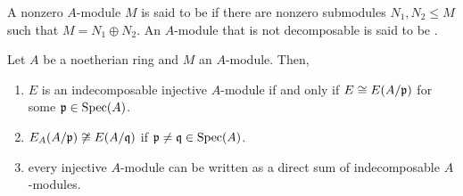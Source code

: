 \begin{definition}
    A nonzero $A$-module $M$ is said to be  if there are nonzero submodules $N_1, N_2\le M$ such that $M = N_1\oplus N_2$. An $A$-module that is not decomposable is said to be .
\end{definition}

\begin{theorem}[Matlis]
    Let $A$ be a noetherian ring and $M$ an $A$-module. Then, 
    \begin{enumerate}[label=(\alph*)]
        \item $E$ is an indecomposable injective $A$-module if and only if $E\cong E(A/\mathfrak{p})$ for some $\mathfrak{p}\in\operatorname{Spec}(A)$.
        \item $E_A(A/\mathfrak{p})\not\cong E(A/\mathfrak{q})$ if $\mathfrak{p}\ne\mathfrak{q}\in\operatorname{Spec}(A)$. 
        \item every injective $A$-module can be written as a direct sum of indecomposable $A$-modules.
    \end{enumerate}
\end{theorem}
